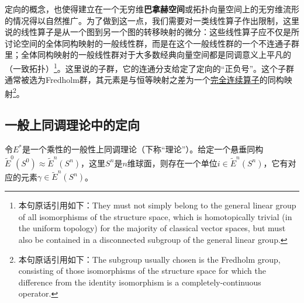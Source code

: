定向的概念，也使得建立在一个无穷维\textbf{巴拿赫空间}或拓扑向量空间上的无穷维流形的情况得以自然推广。为了做到这一点，我们需要对一类线性算子作出限制，这里说的线性算子是从一个图到另一个图的转移映射的微分：这些线性算子应不仅是所讨论空间的全体同构映射的一般线性群，而是在这个一般线性群的一个不连通子群里；全体同构映射的一般线性群对于大多数经典向量空间都是同调意义上平凡的（一致拓扑）\footnote{本句原话引用如下：They must not simply belong to the general linear group of all isomorphisms of the structure space, which is homotopically trivial (in the uniform topology) for the majority of classical vector spaces, but must also be contained in a disconnected subgroup of the general linear group. }。这里说的子群，它的连通分支给定了定向的“正负号”。这个子群通常被选为Fredholm群，其元素是与恒等映射之差为一个\href{https://encyclopediaofmath.org/wiki/Completely-continuous_operator}{完全连续算子}的同构映射\footnote{本句原话引用如下：The subgroup usually chosen is the Fredholm group, consisting of those isomorphisms of the structure space for which the difference from the identity isomorphism is a completely-continuous operator.}。








\subsection{一般上同调理论中的定向}

令$E^*$是一个乘性的一般性上同调理论（下称“理论”）。给定一个悬垂同构$\widetilde{E}^0(S^0)\approx\widetilde{E}^n(S^n)$，这里$S^n$是$n$维球面，则存在一个单位$i\in \widetilde{E}^n(S^n)$，它有对应的元素$\gamma\in \widetilde{E}^n(S^n)$。

